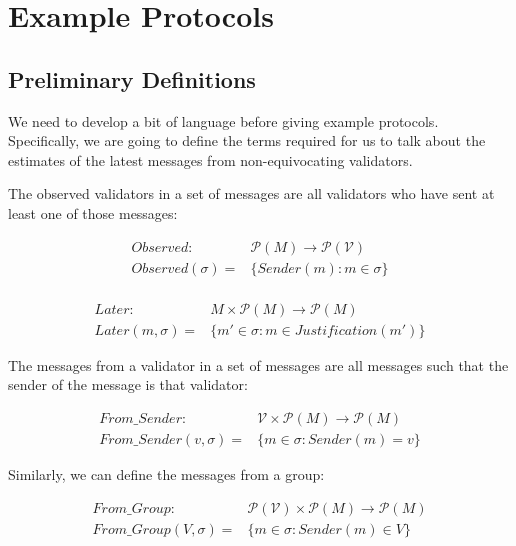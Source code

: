 \section{Example Protocols}
\subsection{Preliminary Definitions}

We need to develop a bit of language before giving example protocols. Specifically, we are going to define the terms required for us to talk about the estimates of the latest messages from non-equivocating validators.

The observed validators in a set of messages are all validators who have sent at least one of those messages:

\begin{defn}
\begin{align*}
Observed:& \mathcal{P}(M) \to \mathcal{P}(\mathcal{V}) \\
Observed(\sigma) =& \{ Sender(m) : m \in \sigma \} \\
\end{align*}
\end{defn}
\begin{defn}
\begin{align*}
Later:&M \times \mathcal{P}(M) \to \mathcal{P}(M) \\
Later(m, \sigma) =& \{m' \in \sigma :  m \in Justification(m') \}
\end{align*}
\end{defn}

The messages from a validator in a set of messages are all messages such that the sender of the message is that validator:

\begin{defn}
\begin{align*}
From\_Sender:& \mathcal{V} \times \mathcal{P}(M) \to \mathcal{P}(M) \\
From\_Sender(v, \sigma) =& \{m \in \sigma : Sender(m) = v \}
\end{align*}
\end{defn}

Similarly, we can define the messages from a group:

\begin{defn}
\begin{align*}
From\_Group:& \mathcal{P}(\mathcal{V}) \times \mathcal{P}(M) \to \mathcal{P}(M) \\
From\_Group(V, \sigma) =& \{m \in \sigma : Sender(m) \in V \} \\
\end{align*}
\end{defn}



